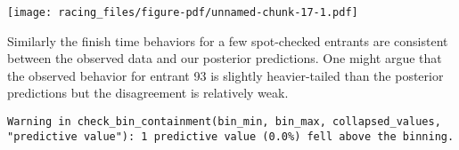 \documentclass[
  letterpaper,
  DIV=11,
  numbers=noendperiod]{scrartcl}
\newenvironment{Shaded}{\begin{snugshade}}{\end{snugshade}}
\newcommand{\AttributeTok}[1]{\textcolor[rgb]{0.40,0.45,0.13}{#1}}
\newcommand{\ControlFlowTok}[1]{\textcolor[rgb]{0.00,0.23,0.31}{#1}}
\newcommand{\DecValTok}[1]{\textcolor[rgb]{0.68,0.00,0.00}{#1}}
\newcommand{\FunctionTok}[1]{\textcolor[rgb]{0.28,0.35,0.67}{#1}}
\newcommand{\NormalTok}[1]{\textcolor[rgb]{0.00,0.23,0.31}{#1}}
\newcommand{\OtherTok}[1]{\textcolor[rgb]{0.00,0.23,0.31}{#1}}
\newcommand{\SpecialCharTok}[1]{\textcolor[rgb]{0.37,0.37,0.37}{#1}}
\newcommand{\StringTok}[1]{\textcolor[rgb]{0.13,0.47,0.30}{#1}}
\begin{document}
\texttt{[image: racing\_files/figure-pdf/unnamed-chunk-17-1.pdf]}

Similarly the finish time behaviors for a few spot-checked entrants are
consistent between the observed data and our posterior predictions. One
might argue that the observed behavior for entrant 93 is slightly
heavier-tailed than the posterior predictions but the disagreement is
relatively weak.

\begin{Shaded}
\end{Shaded}

\begin{verbatim}
Warning in check_bin_containment(bin_min, bin_max, collapsed_values,
"predictive value"): 1 predictive value (0.0%) fell above the binning.
\end{verbatim}
\end{document}

